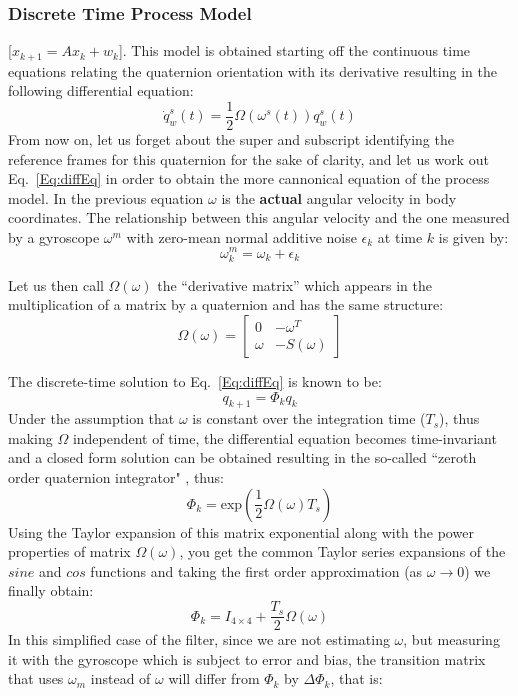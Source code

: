 \documentclass[12pt,a4paper,twoside]{article}
\begin{document}
\subsubsection{{Discrete Time Process Model}}
[$x_{k+1} = Ax_k + w_k$]. This model is obtained starting off the continuous time equations relating the quaternion orientation with its derivative resulting in the following differential equation:
 \begin{equation}
  \dot{q}^{s}_{w}(t) = \frac{1}{2}\Omega(\omega^{s}(t))q^{s}_{w}(t)
  \label{Eq:diffEq}
 \end{equation}
 From now on, let us forget about the super and subscript identifying the reference frames for this quaternion for the sake of clarity, and let us work out Eq.~\ref{Eq:diffEq} in order to obtain the more cannonical equation of the process model. In the previous equation $\omega$ is the \textbf{actual} angular velocity in body coordinates. The relationship between this angular velocity and the one measured by a gyroscope $\omega^m$ with zero-mean normal additive noise $\epsilon_k$ at time $k$ is given by:
  \begin{equation}
   \omega^m_k = \omega_k + \epsilon_k
  \end{equation}

  Let us then call $\Omega(\omega)$ the ``derivative matrix'' which appears in the multiplication of a matrix by a quaternion and has the same structure:
  \begin{equation}
  \Omega(\omega)=
     \left[\begin{array}{cc}
         0      & -\omega^T  \\
       \omega   & -S(\omega)
    \end{array}  \right]
  \end{equation}

  The discrete-time solution to Eq.~\ref{Eq:diffEq} is known to be:
 \begin{equation}
  q_{k+1} = \Phi_k q_k
  \label{Eq:transitionEq}
 \end{equation}
 Under the assumption that $\omega$ is constant over the integration time ($T_s$), thus making $\Omega$ independent of time, the differential equation becomes time-invariant and a closed form solution can be obtained resulting in the so-called ``zeroth order quaternion integrator" , thus:
 \begin{equation}
  \Phi_k = \text{exp}\left( \frac{1}{2}\Omega({\omega})T_s \right)
 \end{equation}
  Using the Taylor expansion of this matrix exponential along with the power properties of matrix $\Omega(\omega)$, you get the common Taylor series expansions of the $sine$ and $cos$ functions and taking the first order approximation (as $\omega \rightarrow 0$) we finally obtain:
  \begin{equation}
   \Phi_k = I_{4\times4} + \frac{T_s}{2}\Omega({\omega})
  \end{equation}
  In this simplified case of the filter, since we are not estimating $\omega$, but measuring it with the gyroscope which is subject to error and bias, the transition matrix that uses $\omega_m$ instead of $\omega$ will differ from $\Phi_k$ by $\Delta\Phi_k$, that is:
\end{document}
